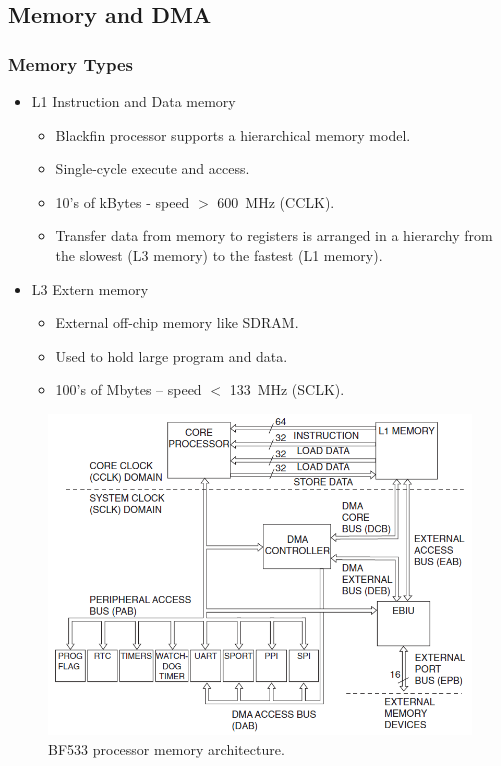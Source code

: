 \subsection{Memory and DMA}
\subsubsection{Memory Types}
\begin{itemize}
	\item L1 Instruction and Data memory
	\begin{itemize}
		\item Blackfin processor supports a hierarchical memory model.
		\item Single-cycle execute and access.
		\item 10's of kBytes - speed $>$ \SI{600}{\mega\hertz} (CCLK).
		\item Transfer	data from memory to registers is arranged in a hierarchy from the slowest (L3 memory) to the fastest (L1 memory).

	\end{itemize}
	\item L3 Extern memory
	\begin{itemize}
		\item External off-chip memory like SDRAM.
		\item Used to hold large program and data.
		\item 100's of Mbytes – speed $<$ \SI{133}{\mega\hertz}  (SCLK).
	\end{itemize}
\end{itemize}

\begin{figure} [H]
	\centering
	\includegraphics[width=\linewidth]{graphics/17.png}
	\caption{BF533 processor memory architecture.}
	\label{fig:17}
\end{figure}

